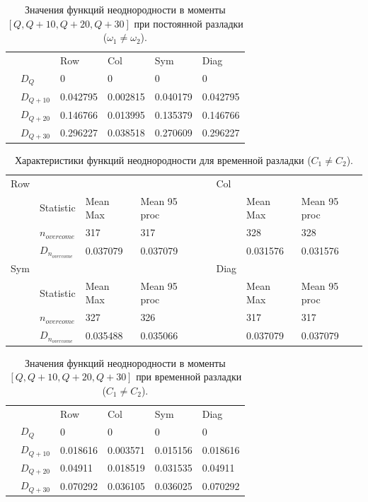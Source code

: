 \documentclass[specialist, substylefile = spbu.rtx,
			   subf, href, 12pt]{disser}
\begin{document}
\begin{table}[!hhh]
	\center
	\caption{Значения функций неоднородности в моменты $ [Q, Q+10, Q+20, Q+30] $ при постоянной разладки ($\omega_1 \neq \omega_2$). }
	\begin{tabular}{llllll}
		&              & Row 	  & Col 	& Sym    & Diag  \\
		& $D_Q$        & 0	  & 0 	& 0 & 0		\\
		& $D_{Q+10}$   & 0.042795   & 0.002815  & 0.040179 & 0.042795	\\
		& $D_{Q+20}$   & 0.146766   & 0.013995  & 0.135379 & 0.146766	\\
		& $D_{Q+30}$   & 0.296227	  &	0.038518	& 0.270609 & 0.296227	
	\end{tabular}
	\label{tab:PermanentHeterogeneityValues}
\end{table}

\begin{table}[!hhh]
	\center
	\caption{Характеристики функций неоднородности для временной разладки ($ C_1 \neq C_2 $).}
	\begin{tabular}{llllllll}
		Row & 				   & 		  	  & 			 && Col & 		      & 			      \\
		& Statistic        & Mean Max 	  & Mean 95 proc && 	& Mean Max     & Mean 95 proc     \\
		& $n_{overcome}$   & 317   	  & 317      &&     & 328       & 328 		  \\
		&$D_{n_{overcome}}$& 0.037079		  &	0.037079	 &&     & 0.031576		  &   0.031576             \\
		Sym & 				   & 		  	  & 			 && Diag& 		      & 			      \\
		& Statistic        & Mean Max 	  & Mean 95 proc && 	& Mean Max     & Mean 95 proc     \\
		& $n_{overcome}$   & 327   	  & 326      &&     & 317      & 317		  \\
		&$D_{n_{overcome}}$& 0.035488		  &	0.035066		 &&     & 0.037079		 & 0.037079             \\
	\end{tabular}
	\label{tab:TemporaryHeterogeneityAmplitude}
\end{table}

\begin{table}[!hhh]
	\center
	\caption{Значения функций неоднородности в моменты $ [Q, Q+10, Q+20, Q+30] $ при временной разладки ($ C_1 \neq C_2 $). }
	\begin{tabular}{llllll}
		&              & Row 	  & Col 	& Sym    & Diag  \\
		& $D_Q$        & 0	  & 0 	& 0 & 0		\\
		& $D_{Q+10}$   & 0.018616   & 0.003571  & 0.015156 & 0.018616	\\
		& $D_{Q+20}$   & 0.04911   & 0.018519  & 0.031535 & 0.04911	\\
		& $D_{Q+30}$   & 0.070292	  &	0.036105	& 0.036025 & 0.070292	
	\end{tabular}
	\label{tab:TemporaryHeterogeneityAmplitudeValues}
\end{table}
\end{document}
